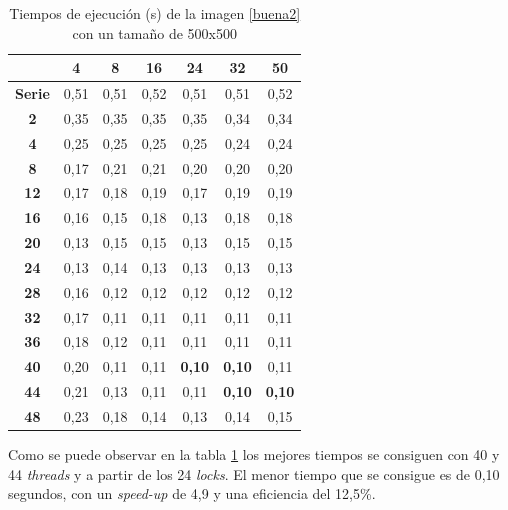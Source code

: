 \begin{table}[H]
	\centering
	\small
	\begin{tabular}{|c|c|c|c|c|c|c|}
		\hline
		{\bf \backslashbox{Threads}{Locks}}   & {\bf 4} & {\bf 8} & {\bf 16} & {\bf 24} & {\bf 32} & {\bf 50} \\ \hline
		{\bf Serie}  & 0,51    & 0,51    & 0,52     & 0,51     & 0,51     & 0,52     \\ \hline
		{\bf 2}  & 0,35    & 0,35    & 0,35     & 0,35     & 0,34     & 0,34     \\ \hline
		{\bf 4}  & 0,25    & 0,25    & 0,25     & 0,25     & 0,24     & 0,24     \\ \hline
		{\bf 8}  & 0,17    & 0,21    & 0,21     & 0,20     & 0,20     & 0,20     \\ \hline
		{\bf 12} & 0,17    & 0,18    & 0,19     & 0,17     & 0,19     & 0,19     \\ \hline
		{\bf 16} & 0,16    & 0,15    & 0,18     & 0,13     & 0,18     & 0,18     \\ \hline
		{\bf 20} & 0,13    & 0,15    & 0,15     & 0,13     & 0,15     & 0,15     \\ \hline
		{\bf 24} & 0,13    & 0,14    & 0,13     & 0,13     & 0,13     & 0,13     \\ \hline
		{\bf 28} & 0,16    & 0,12    & 0,12     & 0,12     & 0,12     & 0,12     \\ \hline
		{\bf 32} & 0,17    & 0,11    & 0,11     & 0,11     & 0,11     & 0,11     \\ \hline
		{\bf 36} & 0,18    & 0,12    & 0,11     & 0,11     & 0,11     & 0,11     \\ \hline
		{\bf 40} & 0,20    & 0,11    & 0,11     & \textbf{0,10}     & \textbf{0,10}     & 0,11     \\ \hline
		{\bf 44} & 0,21    & 0,13    & 0,11     & 0,11     & \textbf{0,10}     & \textbf{0,10}     \\ \hline
		{\bf 48} & 0,23    & 0,18    & 0,14     & 0,13     & 0,14     & 0,15     \\ \hline
	\end{tabular}
	\captionsetup{justification=centering}	
	\caption{Tiempos de ejecuci\'{o}n (s) de la imagen \ref{buena2} con un tama\~{n}o de 500x500}
	\label{img2-500}
\end{table}

Como se puede observar en la tabla \ref{img2-500} los mejores tiempos se consiguen con 40 y 44 \textit{threads} y a partir de los 24 \textit{locks}. El menor tiempo que se consigue es de 0,10 segundos, con un \textit{speed-up} de 4,9 y una eficiencia del 12,5\%.

